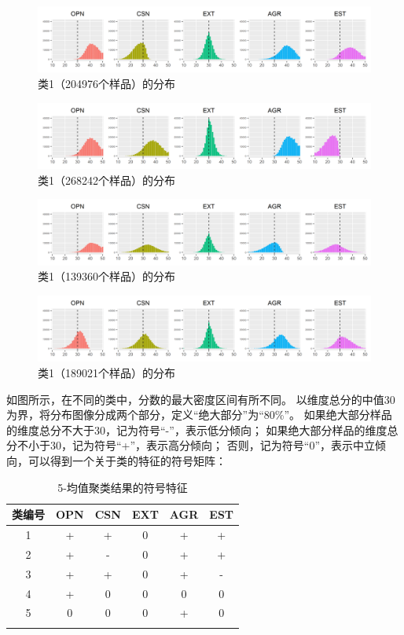 \documentclass[UTF8]{ctexart}
\begin{document}
\begin{figure}[H]
  \centering
  \includegraphics[scale=0.478]{Cluster2.png}
  \caption{类1（204976个样品）的分布}
\end{figure}
\begin{figure}[H]
  \centering
  \includegraphics[scale=0.478]{Cluster3.png}
  \caption{类1（268242个样品）的分布}
\end{figure}
\begin{figure}[H]
  \centering
  \includegraphics[scale=0.478]{Cluster4.png}
  \caption{类1（139360个样品）的分布}
\end{figure}
\begin{figure}[H]
  \centering
  \includegraphics[scale=0.478]{Cluster5.png}
  \caption{类1（189021个样品）的分布}
\end{figure}
如图所示，在不同的类中，分数的最大密度区间有所不同。
以维度总分的中值30为界，将分布图像分成两个部分，定义“绝大部分”为“80\%”。
如果绝大部分样品的维度总分不大于30，记为符号“-”，表示低分倾向；
如果绝大部分样品的维度总分不小于30，记为符号“+”，表示高分倾向；
否则，记为符号“0”，表示中立倾向，可以得到一个关于类的特征的符号矩阵：
\begin{longtable}{c|c|c|c|c|c}
  \hline
  类编号 & OPN & CSN & EXT & AGR & EST \\\hline
  1   & +   & +   & 0   & +   & +   \\
  2   & +   & -   & 0   & +   & +   \\
  3   & +   & +   & 0   & +   & -   \\\hline
  4   & +   & 0   & 0   & 0   & 0   \\
  5   & 0   & 0   & 0   & +   & 0   \\\hline
  \caption{5-均值聚类结果的符号特征}
  \label{symbol5}
\end{longtable}
\end{document}
